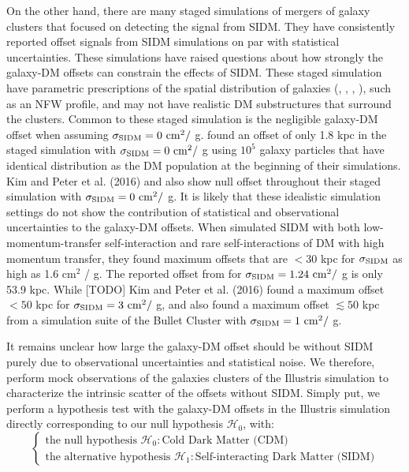 On the other hand, there are many staged simulations of mergers of galaxy
clusters that focused on detecting the signal from
SIDM. They have consistently reported offset signals from SIDM simulations 
on par with statistical 
uncertainties. 
These simulations have raised questions about how strongly the galaxy-DM offsets 
can constrain the effects of SIDM.
These staged simulation have parametric prescriptions of the spatial 
distribution of galaxies 
(\citealt{Randall2008d}, \citealt{Kahlhoefer14}, \citealt{Markevitch2004}, 
\citealt{Robertson2016}), such as an NFW profile, 
and may not have realistic DM substructures that surround the clusters. 
Common to these staged simulation is the negligible galaxy-DM offset when assuming  
$\sigma_{\rm SIDM} = 0 {\rm~cm}^2 /$ g.
\cite{Randall2008d} found an offset of only 1.8 kpc in the staged
simulation with $\sigma_{\rm SIDM} = 0 {\rm~cm}^2 /$ g using $10^5$ 
galaxy particles that have identical distribution as the DM population at the
beginning of their simulations. 
Kim and Peter et al. (2016) and \cite{Kahlhoefer14} also show null offset 
throughout their staged simulation with $\sigma_{\rm SIDM} = 0 {\rm~cm}^2 /$ g.
It is likely that these idealistic simulation settings do not  
show the contribution of statistical and observational uncertainties to 
the galaxy-DM offsets. 
When \cite{Kahlhoefer14} simulated SIDM with both low-momentum-transfer self-interaction 
and rare self-interactions of DM with high momentum transfer, they found maximum 
offsets that are $< 30$ kpc for $\sigma_{\rm SIDM}$ as high as 1.6 cm$^2$ / g.
The reported offset from \cite{Randall2008d}
for $\sigma_{\rm SIDM} = 1.24 {\rm~cm}^2 /$ g is only 53.9 kpc. 
While [TODO] Kim and Peter et al. (2016) found a maximum offset $< 50$ kpc for 
$\sigma_{\rm SIDM} = 3 {\rm~cm}^2 /$ g,
and \cite{Robertson2016} also found a maximum offset $\lesssim 50$ kpc  
 from a simulation suite of the Bullet Cluster with $\sigma_{\rm SIDM} = 1 {\rm~cm}^2 /$ g.

It remains unclear how large the galaxy-DM offset should be 
without SIDM purely due to observational uncertainties and statistical noise. 
We therefore, perform mock observations of the galaxies clusters of the
Illustris simulation to characterize the intrinsic scatter of the offsets without SIDM.  
Simply put, we perform a hypothesis test with the galaxy-DM offsets in
the Illustris simulation directly corresponding to our null hypothesis
$\mathcal{H}_0$, with: 
\begin{equation}
\begin{cases}
	\text{the null hypothesis }\mathcal{H}_0: \text{Cold Dark Matter (CDM)} \\
	\text{the alternative hypothesis }\mathcal{H}_1: \text{Self-interacting Dark
	Matter (SIDM)} 
\end{cases}
\end{equation}

